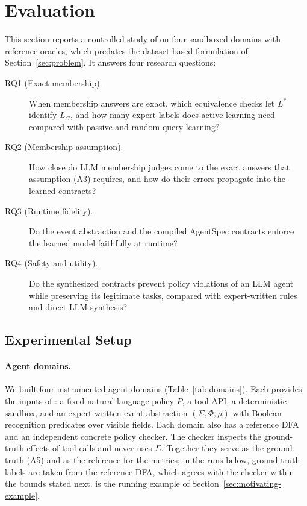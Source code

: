 \section{Evaluation}
\label{sec:eval}\label{sec:evaluation}

This section reports a controlled study of \system{} on four sandboxed domains with reference oracles, which predates the dataset-based formulation of Section~\ref{sec:problem}. %
It answers four research questions:

\begin{description}
  \item[RQ1 (Exact membership).] When membership answers are exact, which equivalence checks let $L^*$ identify $L_G$,
  and how many expert labels does active learning need compared with passive and random-query learning?
  \item[RQ2 (Membership assumption).] How close do LLM membership judges come to the exact answers that assumption
  (A3) requires, and how do their errors propagate into the learned contracts?
  \item[RQ3 (Runtime fidelity).] Do the event abstraction and the compiled AgentSpec contracts enforce the
  learned model faithfully at runtime?
  \item[RQ4 (Safety and utility).] Do the synthesized contracts prevent policy violations of an LLM agent while
  preserving its legitimate tasks, compared with expert-written rules and direct LLM synthesis?
\end{description}

\subsection{Experimental Setup}
\label{sec:setup}

\paragraph{Agent domains.}
We built four instrumented agent domains (Table~\ref{tab:domains}). Each provides the inputs of \system{}: a fixed
natural-language policy $P$, a tool API, a deterministic sandbox, and an expert-written event abstraction
$(\Sigma,\Phi,\mu)$ with Boolean recognition predicates over visible fields. Each domain also has a reference DFA and an independent concrete policy checker. The checker inspects the ground-truth
effects of tool calls and never uses $\Sigma$. Together they serve as the ground truth (A5) and as the reference for the
metrics; in the runs below, ground-truth labels are taken from the reference DFA, which agrees with the checker within
the bounds stated next.  is the running example of Section~\ref{sec:motivating-example}.

